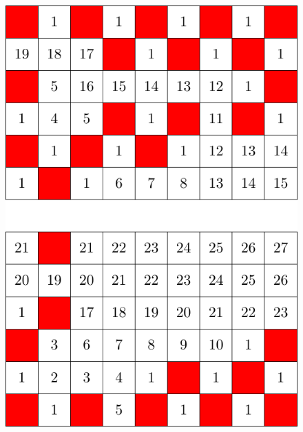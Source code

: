 \begin{figure}[]
\centering
\includegraphics[width=\textwidth]{figures/4/6x9x2_numbered_heatmap.pdf}
\caption{}
\label{fig:6x9x2}
\end{figure} 

